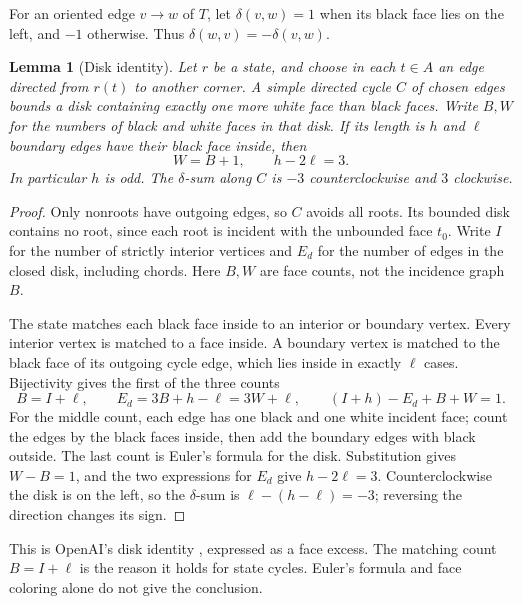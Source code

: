 \documentclass[10pt,a4paper]{amsart}
\newtheorem{lemma}[theorem]{Lemma}
\theoremstyle{remark}
\begin{document}
For an oriented edge $v\to w$ of $T$, let $\delta(v,w)=1$ when its black face lies on the left, and $-1$ otherwise. Thus $\delta(w,v)=-\delta(v,w)$.
\begin{lemma}[Disk identity]\label{lem:disk}
Let $r$ be a state, and choose in each $t\in A$ an edge directed from $r(t)$ to another corner. A simple directed cycle $C$ of chosen edges bounds a disk containing exactly one more white face than black faces. Write $B,W$ for the numbers of black and white faces in that disk. If its length is $h$ and $\ell$ boundary edges have their black face inside, then
\begin{equation}\label{eq:disk}
 W=B+1,\qquad h-2\ell=3.
\end{equation}
In particular $h$ is odd. The $\delta$-sum along $C$ is $-3$ counterclockwise and $3$ clockwise.
\end{lemma}
\begin{proof}
Only nonroots have outgoing edges, so $C$ avoids all roots. Its bounded disk contains no root, since each root is incident with the unbounded face $t_0$. Write $I$ for the number of strictly interior vertices and $E_d$ for the number of edges in the closed disk, including chords. Here $B,W$ are face counts, not the incidence graph $B$.

The state matches each black face inside to an interior or boundary vertex. Every interior vertex is matched to a face inside. A boundary vertex is matched to the black face of its outgoing cycle edge, which lies inside in exactly $\ell$ cases. Bijectivity gives the first of the three counts
\begin{equation}\label{eq:threecounts}
 B=I+\ell,\qquad E_d=3B+h-\ell=3W+\ell,
 \qquad (I+h)-E_d+B+W=1.
\end{equation}
For the middle count, each edge has one black and one white incident face; count the edges by the black faces inside, then add the boundary edges with black outside. The last count is Euler's formula for the disk. Substitution gives $W-B=1$, and the two expressions for $E_d$ give $h-2\ell=3$. Counterclockwise the disk is on the left, so the $\delta$-sum is $\ell-(h-\ell)=-3$; reversing the direction changes its sign.
\end{proof}
This is OpenAI's disk identity \cite[Lemma 4.1]{openai2026}, expressed as a face excess. The matching count $B=I+\ell$ is the reason it holds for state cycles. Euler's formula and face coloring alone do not give the conclusion.
\end{document}
